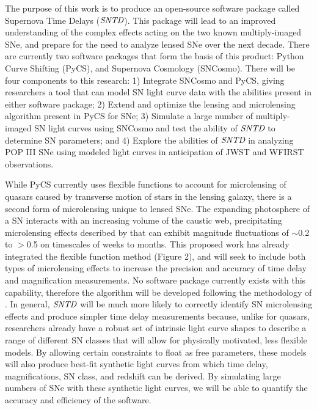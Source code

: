 The purpose of this work is to produce an open-source software
package called Supernova Time Delays ($\textit{SNTD}$). This package will
lead to an improved understanding of the complex effects acting on 
the two known multiply-imaged SNe, and prepare for the need to analyze 
lensed SNe over the next decade.
There are currently two software packages that form the basis 
of this product: Python Curve Shifting (PyCS), and Supernova Cosmology 
(SNCosmo). There will be four components to this research: 1) Integrate 
SNCosmo and PyCS, giving researchers a tool
that can model SN light curve data with the abilities present in either
software package; 2) Extend and optimize the lensing and microlensing
algorithm present in PyCS for SNe; 3) Simulate a large number of multiply-imaged SN
light curves using SNCosmo and test the ability of $\textit{SNTD}$ to
determine SN parameters; and 4) Explore the abilities of
$\textit{SNTD}$ in analyzing POP III SNe using modeled light curves in
anticipation of JWST and WFIRST observations.


While PyCS currently uses flexible functions to account for
microlensing of quasars caused by transverse motion of stars in the
lensing galaxy, there is a second form of microlensing unique to
lensed SNe. The expanding photosphere of a SN interacts with an 
increasing volume of the caustic web, precipitating microlensing effects 
described by \cite{Dobler:2006} that can exhibit magnitude 
fluctuations of $\sim$0.2 to $>$0.5 on timescales of weeks to months. 
This proposed work has already integrated the flexible function method 
(Figure 2), and will seek to include both types of microlensing effects to 
increase the precision and accuracy of time delay and magnification measurements. 
No software package currently
exists with this capability, therefore the algorithm will be developed
following the methodology of \cite{Dobler:2006}. In general,
$\textit{SNTD}$ will be much more likely to correctly identify SN
microlensing effects and produce simpler time delay measurements
because, unlike for quasars, researchers already have a robust set of
intrinsic light curve shapes to describe a range of different SN
classes that will allow for physically motivated, less flexible
models. By allowing certain constraints to float as free parameters,
these models will also produce best-fit synthetic light curves from
which time delay, magnifications, SN class, and redshift can be
derived. By simulating large numbers of SNe with these synthetic light
curves, we will be able to quantify the accuracy and efficiency of the
software.


